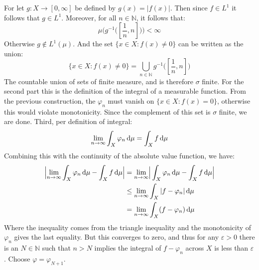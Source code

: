 \documentclass[crop=false,class=article]{standalone}                           %
\begin{document}
        \begin{solution}
            For let $g:X\rightarrow[0,\infty]$ be defined by $g(x)=|f(x)|$. Then
            since $f\in{L}^{1}$ it follows that $g\in{L}^{1}$. Moreover, for all
            $n\in\mathbb{N}$, it follows that:
            \begin{equation}
                \mu\Big(g^{\minus{1}}\big([\frac{1}{n},n]\big)\Big)<\infty
            \end{equation}
            Otherwise $g\notin{L}^{1}(\mu)$. And the set $\{x\in{X}:f(x)\ne{0}\}$
            can be written as the union:
            \begin{equation}
                \{x\in{X}:f(x)\ne{0}\}
                =\bigcup_{n\in\mathbb{N}}g^{\minus{1}}\big([\frac{1}{n},n]\big)
            \end{equation}
            The countable union of sets of finite measure, and is therefore
            $\sigma$ finite. For the second part this is the definition of the
            integral of a measurable function. From the previous construction, the
            $\varphi_{n}$ must vanish on $\{x\in{X}:f(x)=0\}$, otherwise this would
            violate monotonicity. Since the complement of this set is $\sigma$
            finite, we are done. Third, per definition of integral:
            \begin{equation}
                \underset{n\rightarrow\infty}{\lim}\int_{X}\varphi_{n}\mathop{}\!\mathrm{d}\mu
                =\int_{X}f\mathop{}\!\mathrm{d}\mu
            \end{equation}
            Combining this with the continuity of the absolute value function,
            we have:
            \begin{align}
                \Big|\underset{n\rightarrow\infty}{\lim}\int_{X}\varphi_{n}\mathop{}\!\mathrm{d}\mu-
                    \int_{X}f\mathop{}\!\mathrm{d}\mu\Big|
                &=\underset{n\rightarrow\infty}{\lim}\Big|
                    \int_{X}\varphi_{n}\mathop{}\!\mathrm{d}\mu-\int_{X}f\mathop{}\!\mathrm{d}\mu\Big|\\
                &\leq\underset{n\rightarrow\infty}{\lim}\int_{X}|
                    f-\varphi_{n}|\mathop{}\!\mathrm{d}\mu\\
                &=\underset{n\rightarrow\infty}{\lim}\int_{X}(f-\varphi_{n})\mathop{}\!\mathrm{d}\mu
            \end{align}
            Where the inequality comes from the triangle inequality and the
            monotonicity of $\varphi_{n}$ gives the last equality. But this
            converges to zero, and thus for any $\varepsilon>0$ there is an
            $N\in\mathbb{N}$ such that $n>N$ implies the integral of
            $f-\varphi_{n}$ across $X$ is less than $\varepsilon$. Choose
            $\varphi=\varphi_{N+1}$.
        \end{solution}
\end{document}
